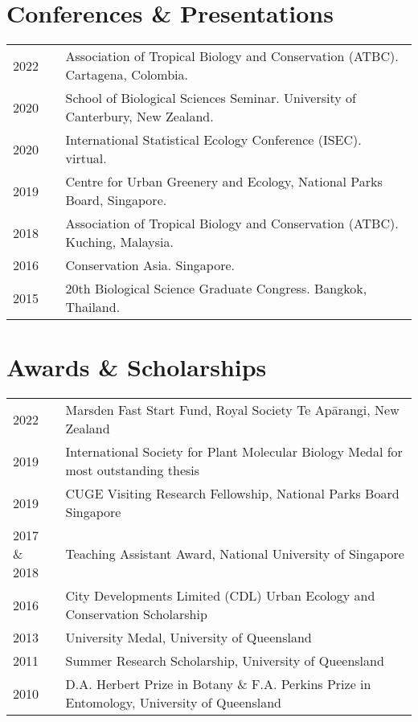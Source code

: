 \documentclass[a4paper]{article}
\begin{document}
\section*{Conferences \& Presentations}
\begin{tabular}{p{0.13\linewidth} p{0.87\linewidth}}
2022 & Association of Tropical Biology and Conservation (ATBC). Cartagena, Colombia. \\
2020 & School of Biological Sciences Seminar. University of Canterbury, New Zealand. \\
2020 & International Statistical Ecology Conference (ISEC). virtual. \\
2019 & Centre for Urban Greenery and Ecology, National Parks Board, Singapore. \\
2018 & Association of Tropical Biology and Conservation (ATBC). Kuching, Malaysia. \\
2016 & Conservation Asia. Singapore. \\
2015 & 20th Biological Science Graduate Congress. Bangkok, Thailand. \\
\end{tabular}


\section*{Awards \& Scholarships}
\begin{tabular}{p{0.13\linewidth} p{0.87\linewidth}}
2022 & Marsden Fast Start Fund, Royal Society Te Ap\=arangi, New Zealand \\
2019 & International Society for Plant Molecular Biology Medal for most outstanding thesis \\
2019 & CUGE Visiting Research Fellowship, National Parks Board Singapore \\
2017 \& 2018 & Teaching Assistant Award, National University of Singapore \\
2016 & City Developments Limited (CDL) Urban Ecology and Conservation Scholarship \\
2013 & University Medal, University of Queensland \\
2011 & Summer Research Scholarship, University of Queensland \\
2010 & D.A. Herbert Prize in Botany \& F.A. Perkins Prize in Entomology, University of Queensland 
\end{tabular}
\end{document}
